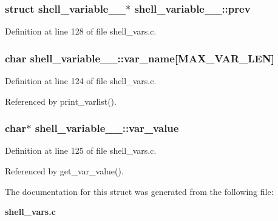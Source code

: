 \subsubsection{\setlength{\rightskip}{0pt plus 5cm}struct {\bf shell\_\-variable\_\-\_\-}$\ast$ {\bf shell\_\-variable\_\-\_\-::prev}}\label{structshell__variable_____o4}




Definition at line 128 of file shell\_\-vars.c.
\subsubsection{\setlength{\rightskip}{0pt plus 5cm}char {\bf shell\_\-variable\_\-\_\-::var\_\-name}[MAX\_\-VAR\_\-LEN]}\label{structshell__variable_____o0}




Definition at line 124 of file shell\_\-vars.c.

Referenced by print\_\-varlist().
\subsubsection{\setlength{\rightskip}{0pt plus 5cm}char$\ast$ {\bf shell\_\-variable\_\-\_\-::var\_\-value}}\label{structshell__variable_____o1}




Definition at line 125 of file shell\_\-vars.c.

Referenced by get\_\-var\_\-value().

The documentation for this struct was generated from the following file:\begin{CompactItemize}
\item 
{\bf shell\_\-vars.c}\end{CompactItemize}
